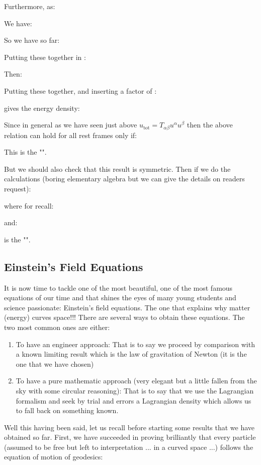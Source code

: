 	Furthermore, as:
	
	We have:
	
	So we have so far:
	
	Putting these together in :
	
	Then:
	
	Putting these together, and inserting a factor of :
		
	gives the energy density:
	
	Since in general as we have seen just above $u_\text{tot}=T_{\alpha\beta}u^\alpha u^\beta$ then the above relation can hold for all rest frames only if:
	
	This is the "\label{electromagnetic stress energy tensor}".
	
	But we should also check that this result is symmetric. Then if we do the calculations (boring elementary algebra but we can give the details on readers request):
	
	where for recall:
	
	and:
	
	is the "\label{Maxwell stress tensor}".
	
	\pagebreak
	\subsection{Einstein's Field Equations}\label{einstein field equations}
	It is now time to tackle one of the most beautiful, one of the most famous equations of our time and that shines the eyes of many young students and science passionate: Einstein's field equations. The one that explains why matter (energy) curves space!!! There are several ways to obtain these equations. The two most common ones are either:
	\begin{enumerate}
		\item To have an engineer approach: That is to say we proceed by comparison with a known limiting result which is the law of gravitation of Newton (it is the one that we have chosen)

		\item To have a pure mathematic approach (very elegant but a little fallen from the sky with some circular reasoning): That is to say that we use the Lagrangian formalism and seek by trial and errors a Lagrangian density which allows us to fall back on something known.
	\end{enumerate}
	Well this having been said, let us recall before starting some results that we have obtained so far. First, we have succeeded in proving brilliantly that every particle (assumed to be free but left to interpretation ... in a curved space ...) follows the equation of motion of geodesics:
	
